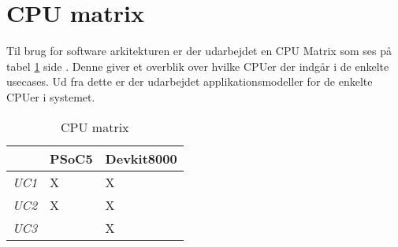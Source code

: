 \section{CPU matrix}

Til brug for software arkitekturen er der udarbejdet en CPU Matrix som ses på tabel \ref{CPUmatrix} side \pageref{CPUmatrix}. Denne giver et overblik over hvilke CPUer der indgår i de enkelte usecases. Ud fra dette er der udarbejdet applikationsmodeller for de enkelte CPUer i systemet.

\begin{table}[H]
\centering
\caption{CPU matrix}
\label{CPUmatrix}

\begin{tabular}{ p{40pt} | p{80pt} | p{70 pt} }\hline
\rowcolor{white} & PSoC5 & Devkit8000\\
\hline
\rowcolor{white} \emph{UC1} & X & X\\

\rowcolor{white} \emph{UC2} & X & X\\

\rowcolor{white} \emph{UC3} & & X\\
\end{tabular}
\end{table}